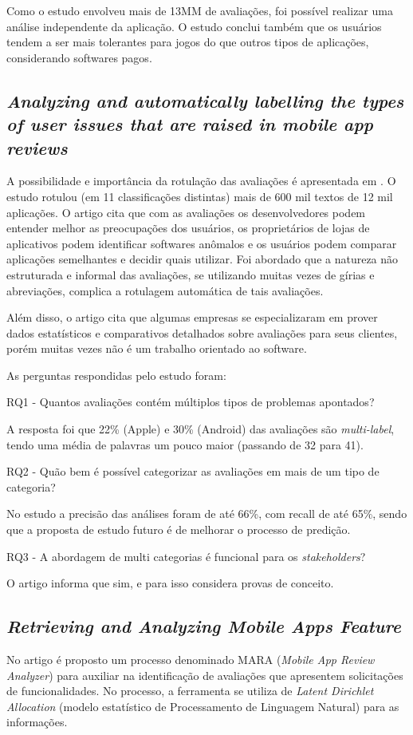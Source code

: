 Como o estudo envolveu mais de 13MM de avaliações, foi possível realizar uma análise independente da aplicação. O estudo conclui também que os usuários tendem a ser mais tolerantes para jogos do que outros tipos de aplicações, considerando softwares pagos.

\subsection{\textit{Analyzing and automatically labelling the types of user issues that are raised in mobile app reviews}}
A possibilidade e importância da rotulação das avaliações é apresentada em \cite{Mcilroy2016analyzing}. O estudo rotulou (em 11 classificações distintas) mais de 600 mil textos de 12 mil aplicações. O artigo cita que com as avaliações os desenvolvedores podem entender melhor as preocupações dos usuários, os proprietários de lojas de aplicativos podem identificar softwares anômalos e os usuários podem comparar aplicações semelhantes e decidir quais utilizar. Foi abordado que a natureza não estruturada e informal das avaliações, se utilizando muitas vezes de gírias e abreviações, complica a rotulagem automática de tais avaliações.

Além disso, o artigo cita que algumas empresas se especializaram em prover dados estatísticos e comparativos detalhados sobre avaliações para seus clientes, porém muitas vezes não é um trabalho orientado ao software.

As perguntas respondidas pelo estudo foram:

RQ1 - Quantos avaliações contém múltiplos tipos de problemas apontados?

A resposta foi que 22\% (Apple) e 30\% (Android) das avaliações são \textit{multi-label}, tendo uma média de palavras um pouco maior (passando de 32 para 41).

RQ2 - Quão bem é possível categorizar as avaliações em mais de um tipo de categoria?

No estudo a precisão das análises foram de até 66\%, com recall de até 65\%, sendo que a proposta de estudo futuro é de melhorar o processo de predição.

RQ3 - A abordagem de multi categorias é funcional para os \textit{stakeholders}?

O artigo informa que sim, e para isso considera provas de conceito.


\subsection{\textit{Retrieving and Analyzing Mobile Apps Feature}}
No artigo \cite{Iacob2013retrieving} é proposto um processo denominado MARA (\textit{Mobile App Review Analyzer}) para auxiliar na identificação de avaliações que apresentem solicitações de funcionalidades. No processo, a ferramenta se utiliza de \textit{Latent Dirichlet Allocation} (modelo estatístico de Processamento de Linguagem Natural) para as informações.

